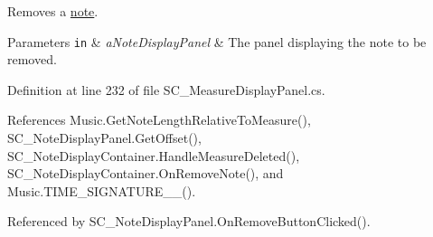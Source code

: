 Removes a \hyperlink{group___music_structs_struct_music_1_1_combined_note}{note}. 


\begin{DoxyParams}[1]{Parameters}
\mbox{\tt in}  & {\em a\+Note\+Display\+Panel} & The panel displaying the note to be removed. \\
\hline
\end{DoxyParams}


Definition at line 232 of file S\+C\+\_\+\+Measure\+Display\+Panel.\+cs.



References Music.\+Get\+Note\+Length\+Relative\+To\+Measure(), S\+C\+\_\+\+Note\+Display\+Panel.\+Get\+Offset(), S\+C\+\_\+\+Note\+Display\+Container.\+Handle\+Measure\+Deleted(), S\+C\+\_\+\+Note\+Display\+Container.\+On\+Remove\+Note(), and Music.\+T\+I\+M\+E\+\_\+\+S\+I\+G\+N\+A\+T\+U\+R\+E\+\_\+\_().



Referenced by S\+C\+\_\+\+Note\+Display\+Panel.\+On\+Remove\+Button\+Clicked().


